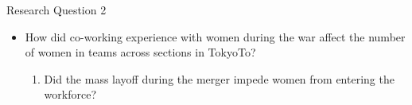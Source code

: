 \begin{frame}{Research Question 2}
    \begin{itemize}
        \item How did co-working experience with women during the war affect the number of women in teams across sections in TokyoTo?
        \begin{enumerate}
            \item Did the mass layoff during the merger impede women from entering the workforce?
        \end{enumerate}
    \end{itemize}
\end{frame}